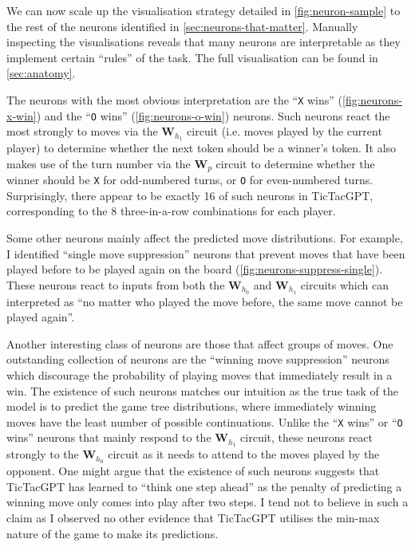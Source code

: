 \documentclass{article}
\newcommand{\ttgpt}{TicTacGPT\xspace}
\newcommand{\m}[1]{\mathbf{\bm{#1}}}
\newcounter{num}
\begin{document}
We can now scale up the visualisation strategy detailed in \cref{fig:neuron-sample} to the rest of the neurons identified in \cref{sec:neurons-that-matter}. Manually inspecting the visualisations reveals that many neurons are interpretable as they implement certain ``rules'' of the task. The full visualisation can be found in \cref{sec:anatomy}.

The neurons with the most obvious interpretation are the ``\texttt{X} wins'' (\cref{fig:neurons-x-win}) and the ``\texttt{O} wins'' (\cref{fig:neurons-o-win}) neurons. Such neurons react the most strongly to moves via the $\m{W}_{h_1}$ circuit (i.e. moves played by the current player) to determine whether the next token should be a winner's token. It also makes use of the turn number via the $\m{W}_p$ circuit to determine whether the winner should be \texttt{X} for odd-numbered turns, or \texttt{O} for even-numbered turns. Surprisingly, there appear to be exactly 16 of such neurons in \ttgpt, corresponding to the 8 three-in-a-row combinations for each player.

Some other neurons mainly affect the predicted move distributions. For example, I identified ``single move suppression'' neurons that prevent moves that have been played before to be played again on the board (\cref{fig:neurons-suppress-single}). These neurons react to inputs from both the $\m{W}_{h_0}$ and $\m{W}_{h_1}$ circuits which can interpreted as ``no matter who played the move before, the same move cannot be played again''.

Another interesting class of neurons are those that affect groups of moves. One outstanding collection of neurons are the ``winning move suppression'' neurons which discourage the probability of playing moves that immediately result in a win. The existence of such neurons matches our intuition as the true task of the model is to predict the game tree distributions, where immediately winning moves have the least number of possible continuations. Unlike the ``\texttt{X} wins'' or ``\texttt{O} wins'' neurons that mainly respond to the $\m{W}_{h_1}$ circuit, these neurons react strongly to the $\m{W}_{h_0}$ circuit as it needs to attend to the moves played by the opponent. One might argue that the existence of such neurons suggests that \ttgpt has learned to ``think one step ahead'' as the penalty of predicting a winning move only comes into play after two steps. I tend not to believe in such a claim as I observed no other evidence that \ttgpt utilises the min-max nature of the game to make its predictions.
\end{document}
